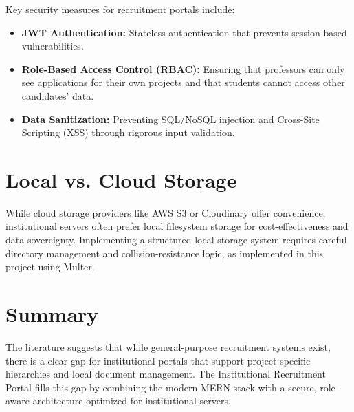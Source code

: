 Key security measures for recruitment portals include:
\begin{itemize}
  \item \textbf{JWT Authentication:} Stateless authentication that prevents session-based vulnerabilities.
  \item \textbf{Role-Based Access Control (RBAC):} Ensuring that professors can only see applications for their own projects and that students cannot access other candidates' data.
  \item \textbf{Data Sanitization:} Preventing SQL/NoSQL injection and Cross-Site Scripting (XSS) through rigorous input validation.
\end{itemize}

\section{Local vs. Cloud Storage}

While cloud storage providers like AWS S3 or Cloudinary offer convenience, institutional servers often prefer local filesystem storage for cost-effectiveness and data sovereignty. Implementing a structured local storage system requires careful directory management and collision-resistance logic, as implemented in this project using Multer.

\section{Summary}

The literature suggests that while general-purpose recruitment systems exist, there is a clear gap for institutional portals that support project-specific hierarchies and local document management. The Institutional Recruitment Portal fills this gap by combining the modern MERN stack with a secure, role-aware architecture optimized for institutional servers.
